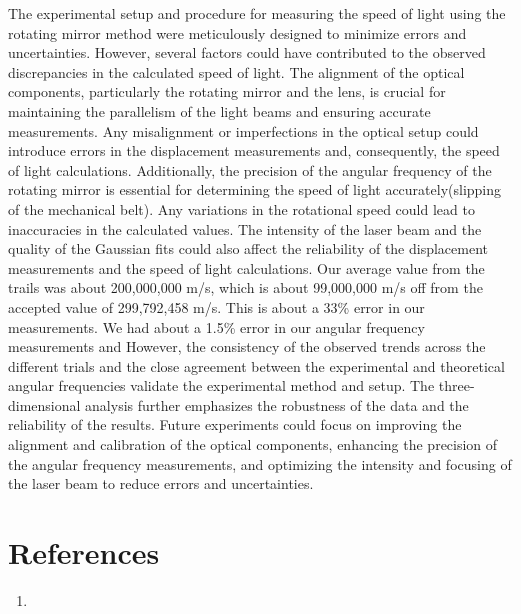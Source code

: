 \documentclass[12pt]{article}
\begin{document}
        The experimental setup and procedure for measuring the speed of light using the rotating mirror method
        were meticulously designed to minimize errors and uncertainties. However, several factors could have
        contributed to the observed discrepancies in the calculated speed of light. The alignment of the optical
        components, particularly the rotating mirror and the lens, is crucial for maintaining the parallelism of
        the light beams and ensuring accurate measurements. Any misalignment or imperfections in the optical
        setup could introduce errors in the displacement measurements and, consequently, the speed of light
        calculations. Additionally, the precision of the angular frequency of the rotating mirror is essential
        for determining the speed of light accurately(slipping of the mechanical belt). Any variations in the rotational speed could lead to
        inaccuracies in the calculated values. The intensity of the laser beam and the quality of the Gaussian
        fits could also affect the reliability of the displacement measurements and the speed of light calculations.
        Our average value from the trails was about 200,000,000 m/s, which is about 99,000,000 m/s off from the accepted value of 299,792,458 m/s.
        This is about a 33\% error in our measurements. We had about a 1.5\% error in our angular frequency measurements and 
        However, the consistency of the observed trends across the different trials and the close agreement between
        the experimental and theoretical angular frequencies validate the experimental method and setup. The three-dimensional
        analysis further emphasizes the robustness of the data and the reliability of the results. Future experiments could
        focus on improving the alignment and calibration of the optical components, enhancing the precision of the angular
        frequency measurements, and optimizing the intensity and focusing of the laser beam to reduce errors and uncertainties.
        



\section{References}
    \begin{enumerate}
        \sloppy
        \item  
    \end{enumerate}
\end{document}
